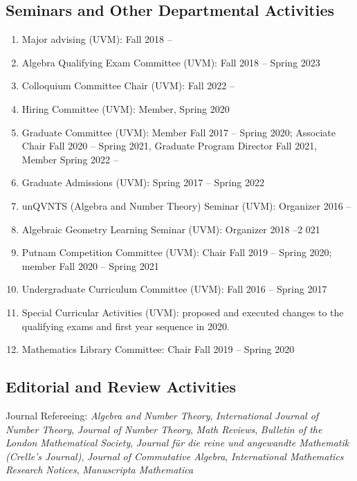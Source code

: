 \documentclass[a4paper,10pt]{article}
\begin{document}
\subsection*{Seminars and Other Departmental Activities}

\begin{enumerate}
	\item Major advising (UVM): Fall 2018 --
	\item Algebra Qualifying Exam Committee (UVM): Fall 2018 -- Spring 2023
	\item Colloquium Committee Chair (UVM): Fall 2022 --
	\item Hiring Committee (UVM): Member, Spring 2020
	\item Graduate Committee (UVM): Member Fall 2017 -- Spring 2020; Associate Chair Fall 2020 -- Spring 2021, Graduate Program Director Fall 2021, Member Spring 2022 -- 
	\item Graduate Admissions (UVM): Spring 2017 -- Spring 2022
	\item unQVNTS (Algebra and Number Theory) Seminar (UVM): Organizer 2016 --
	\item Algebraic Geometry Learning Seminar (UVM): Organizer 2018 --2 021
	\item Putnam Competition Committee (UVM): Chair Fall 2019 -- Spring 2020; member Fall 2020 -- Spring 2021
	\item Undergraduate Curriculum Committee (UVM): Fall 2016 -- Spring 2017 
	\item Special Curricular Activities (UVM): proposed and executed changes to the qualifying exams and first year sequence in 2020. 
	\item Mathematics Library Committee:  Chair Fall 2019 -- Spring 2020
\end{enumerate}

\subsection*{Editorial and Review Activities}
Journal Refereeing: \emph{Algebra and Number Theory}, \emph{International Journal of Number Theory}, \emph{Journal of Number Theory}, \emph{Math Reviews}, \emph{Bulletin of the London Mathematical Society},  \emph{Journal für die reine und angewandte Mathematik (Crelle’s Journal)}, \emph{Journal of Commutative Algebra}, \emph{International Mathematics Research Notices}, \emph{Manuscripta Mathematica} \emph{}
\end{document}
